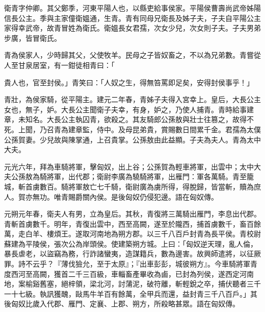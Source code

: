 
\begin{pinyinscope}
衛青字仲卿。其父鄭季，河東平陽人也，以縣吏給事侯家。平陽侯曹壽尚武帝姊陽信長公主。季與主家僮衛媼通，生青。青有同母兄衛長及姊子夫，子夫自平陽公主家得幸武帝，故青冒姓為衛氏。衛媼長女君孺，次女少兒，次女則子夫。子夫男弟步廣，皆冒衛氏。

青為侯家人，少時歸其父，父使牧羊。民母之子皆奴畜之，不以為兄弟數。青嘗從人至甘泉居室，有一鉗徒相青曰：「

貴人也，官至封侯。」青笑曰：「人奴之生，得無笞罵即足矣，安得封侯事乎！」

青壯，為侯家騎，從平陽主。建元二年春，青姊子夫得入宮幸上。皇后，大長公主女也，無子，妒。大長公主聞衛子夫幸，有身，妒之，乃使人捕青。青時給事建章，未知名。大長公主執囚青，欲殺之。其友騎郎公孫敖與壯士往篡之，故得不死。上聞，乃召青為建章監，侍中。及母昆弟貴，賞賜數日間累千金。君孺為太僕公孫賀妻。少兒故與陳掌通，上召貴掌。公孫敖由此益顯。子夫為夫人。青為太中大夫。

元光六年，拜為車騎將軍，擊匈奴，出上谷；公孫賀為輕車將軍，出雲中；太中大夫公孫敖為騎將軍，出代郡；衛尉李廣為驍騎將軍，出雁門：軍各萬騎。青至籠城，斬首虜數百。騎將軍敖亡七千騎，衛尉廣為虜所得，得脫歸，皆當斬，贖為庶人。賀亦無功。唯青賜爵關內侯。是後匈奴仍侵犯邊。語在匈奴傳。

元朔元年春，衛夫人有男，立為皇后。其秋，青復將三萬騎出雁門，李息出代郡。青斬首虜數千。明年，青復出雲中，西至高闕，遂至於隴西，捕首虜數千，畜百餘萬，走白羊、樓煩王。遂取河南地為朔方郡。以三千八百戶封青為長平侯。青校尉蘇建為平陵侯，張次公為岸頭侯。使建築朔方城。上曰：「匈奴逆天理，亂人倫，暴長虐老，以盜竊為務，行詐諸蠻夷，造謀籍兵，數為邊害。故興師遣將，以征厥罪。詩不云乎？『薄伐獫允，至于太原』；『出車彭彭，城彼朔方』。今車騎將軍青度西河至高闕，獲首二千三百級，車輜畜產畢收為鹵，已封為列侯，遂西定河南地，案榆谿舊塞，絕梓領，梁北河，討蒲泥，破符離，斬輕銳之卒，捕伏聽者三千一十七級。執訊獲醜，敺馬牛羊百有餘萬，全甲兵而還，益封青三千八百戶。」其後匈奴比歲入代郡、雁門、定襄、上郡、朔方，所殺略甚眾。語在匈奴傳。


\end{pinyinscope}
